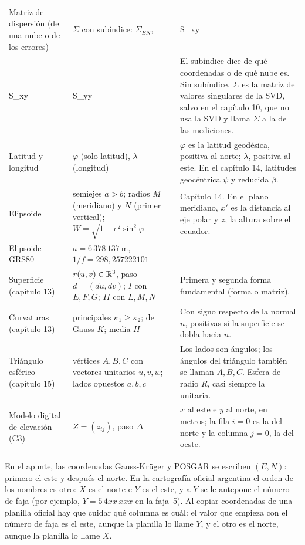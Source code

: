 {\begin{longtable}{@{}>{\raggedright\arraybackslash}p{38mm}>{\raggedright\arraybackslash}p{44mm}>{\raggedright\arraybackslash}p{62mm}@{}}
Matriz de dispersión (de una nube o de los errores) & \(\Sigma\) con subíndice: \(\Sigma_{EN}\), \(\Sigma_0=X_0^TX_0=\left(\begin{smallmatrix}S_{xx}&S_{xy}\\S_{xy}&S_{yy}\end{smallmatrix}\right)\) & El subíndice dice de qué coordenadas o de qué nube es. Sin subíndice, \(\Sigma\) es la matriz de valores singulares de la SVD, salvo en el capítulo 10, que no usa la SVD y llama \(\Sigma\) a la de las mediciones.\\
Latitud y longitud & \(\varphi\) (solo latitud), \(\lambda\) (longitud) & \(\varphi\) es la latitud geodésica, positiva al norte; \(\lambda\), positiva al este. En el capítulo 14, latitudes geocéntrica \(\psi\) y reducida \(\beta\).\\
Elipsoide & semiejes \(a>b\); radios \(M\) (meridiano) y \(N\) (primer vertical); \(W=\sqrt{1-e^2\sin^2\varphi}\) & Capítulo 14. En el plano meridiano, \(x'\) es la distancia al eje polar y \(z\), la altura sobre el ecuador.\\
Elipsoide GRS80 & \(a=6\,378\,137\ \mathrm{m}\), \(1/f=298{,}257222101\) & \\
Superficie (capítulo 13) & \(r(u,v)\in\mathbb{R}^3\), paso \(d=(du,dv)\); \(I\) con \(E,F,G\); \(II\) con \(L,M,N\) & Primera y segunda forma fundamental (forma o matriz).\\
Curvaturas (capítulo 13) & principales \(\kappa_1\ge\kappa_2\); de Gauss \(K\); media \(H\) & Con signo respecto de la normal \(n\), positivas si la superficie se dobla hacia \(n\).\\
Triángulo esférico (capítulo 15) & vértices \(A,B,C\) con vectores unitarios \(u,v,w\); lados opuestos \(a,b,c\) & Los lados son ángulos; los ángulos del triángulo también se llaman \(A,B,C\). Esfera de radio \(R\), casi siempre la unitaria.\\
Modelo digital de elevación (C3) & \(Z=(z_{ij})\), paso \(\Delta\) & \(x\) al este e \(y\) al norte, en metros; la fila \(i=0\) es la del norte y la columna \(j=0\), la del oeste.\\
\end{longtable}
}

\begin{atencion}
\label{caja:convencion-en}
En el apunte, las coordenadas Gauss-Krüger y POSGAR se escriben \((E,N)\): primero el este y
después el norte. En la cartografía oficial argentina el orden de los nombres es otro: \(X\)
es el norte e \(Y\) es el este, y a \(Y\) se le antepone el número de faja (por ejemplo,
\(Y=5\,4xx\,xxx\) en la faja~5). Al copiar coordenadas de una planilla oficial hay que
cuidar qué columna es cuál: el valor que empieza con el número de faja es el este, aunque la
planilla lo llame \(Y\), y el otro es el norte, aunque la planilla lo llame \(X\).
\end{atencion}

